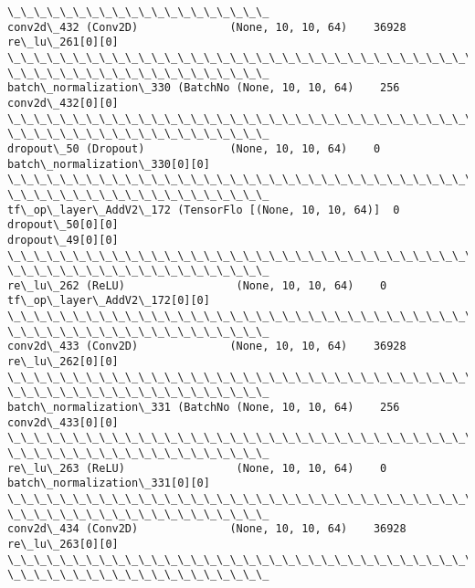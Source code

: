 \documentclass[11pt]{article}
\begin{document}
\begin{Verbatim}[commandchars=\\\{\}]
\_\_\_\_\_\_\_\_\_\_\_\_\_\_\_\_\_\_\_\_
conv2d\_432 (Conv2D)              (None, 10, 10, 64)    36928
re\_lu\_261[0][0]
\_\_\_\_\_\_\_\_\_\_\_\_\_\_\_\_\_\_\_\_\_\_\_\_\_\_\_\_\_\_\_\_\_\_\_\_\_\_\_\_\_\_\_\_\_\_\_\_\_\_\_\_\_\_\_\_\_\_\_\_\_\_\_\_\_\_\_\_\_\_\_\_\_\_\_\_\_\_\_\_
\_\_\_\_\_\_\_\_\_\_\_\_\_\_\_\_\_\_\_\_
batch\_normalization\_330 (BatchNo (None, 10, 10, 64)    256
conv2d\_432[0][0]
\_\_\_\_\_\_\_\_\_\_\_\_\_\_\_\_\_\_\_\_\_\_\_\_\_\_\_\_\_\_\_\_\_\_\_\_\_\_\_\_\_\_\_\_\_\_\_\_\_\_\_\_\_\_\_\_\_\_\_\_\_\_\_\_\_\_\_\_\_\_\_\_\_\_\_\_\_\_\_\_
\_\_\_\_\_\_\_\_\_\_\_\_\_\_\_\_\_\_\_\_
dropout\_50 (Dropout)             (None, 10, 10, 64)    0
batch\_normalization\_330[0][0]
\_\_\_\_\_\_\_\_\_\_\_\_\_\_\_\_\_\_\_\_\_\_\_\_\_\_\_\_\_\_\_\_\_\_\_\_\_\_\_\_\_\_\_\_\_\_\_\_\_\_\_\_\_\_\_\_\_\_\_\_\_\_\_\_\_\_\_\_\_\_\_\_\_\_\_\_\_\_\_\_
\_\_\_\_\_\_\_\_\_\_\_\_\_\_\_\_\_\_\_\_
tf\_op\_layer\_AddV2\_172 (TensorFlo [(None, 10, 10, 64)]  0
dropout\_50[0][0]
dropout\_49[0][0]
\_\_\_\_\_\_\_\_\_\_\_\_\_\_\_\_\_\_\_\_\_\_\_\_\_\_\_\_\_\_\_\_\_\_\_\_\_\_\_\_\_\_\_\_\_\_\_\_\_\_\_\_\_\_\_\_\_\_\_\_\_\_\_\_\_\_\_\_\_\_\_\_\_\_\_\_\_\_\_\_
\_\_\_\_\_\_\_\_\_\_\_\_\_\_\_\_\_\_\_\_
re\_lu\_262 (ReLU)                 (None, 10, 10, 64)    0
tf\_op\_layer\_AddV2\_172[0][0]
\_\_\_\_\_\_\_\_\_\_\_\_\_\_\_\_\_\_\_\_\_\_\_\_\_\_\_\_\_\_\_\_\_\_\_\_\_\_\_\_\_\_\_\_\_\_\_\_\_\_\_\_\_\_\_\_\_\_\_\_\_\_\_\_\_\_\_\_\_\_\_\_\_\_\_\_\_\_\_\_
\_\_\_\_\_\_\_\_\_\_\_\_\_\_\_\_\_\_\_\_
conv2d\_433 (Conv2D)              (None, 10, 10, 64)    36928
re\_lu\_262[0][0]
\_\_\_\_\_\_\_\_\_\_\_\_\_\_\_\_\_\_\_\_\_\_\_\_\_\_\_\_\_\_\_\_\_\_\_\_\_\_\_\_\_\_\_\_\_\_\_\_\_\_\_\_\_\_\_\_\_\_\_\_\_\_\_\_\_\_\_\_\_\_\_\_\_\_\_\_\_\_\_\_
\_\_\_\_\_\_\_\_\_\_\_\_\_\_\_\_\_\_\_\_
batch\_normalization\_331 (BatchNo (None, 10, 10, 64)    256
conv2d\_433[0][0]
\_\_\_\_\_\_\_\_\_\_\_\_\_\_\_\_\_\_\_\_\_\_\_\_\_\_\_\_\_\_\_\_\_\_\_\_\_\_\_\_\_\_\_\_\_\_\_\_\_\_\_\_\_\_\_\_\_\_\_\_\_\_\_\_\_\_\_\_\_\_\_\_\_\_\_\_\_\_\_\_
\_\_\_\_\_\_\_\_\_\_\_\_\_\_\_\_\_\_\_\_
re\_lu\_263 (ReLU)                 (None, 10, 10, 64)    0
batch\_normalization\_331[0][0]
\_\_\_\_\_\_\_\_\_\_\_\_\_\_\_\_\_\_\_\_\_\_\_\_\_\_\_\_\_\_\_\_\_\_\_\_\_\_\_\_\_\_\_\_\_\_\_\_\_\_\_\_\_\_\_\_\_\_\_\_\_\_\_\_\_\_\_\_\_\_\_\_\_\_\_\_\_\_\_\_
\_\_\_\_\_\_\_\_\_\_\_\_\_\_\_\_\_\_\_\_
conv2d\_434 (Conv2D)              (None, 10, 10, 64)    36928
re\_lu\_263[0][0]
\_\_\_\_\_\_\_\_\_\_\_\_\_\_\_\_\_\_\_\_\_\_\_\_\_\_\_\_\_\_\_\_\_\_\_\_\_\_\_\_\_\_\_\_\_\_\_\_\_\_\_\_\_\_\_\_\_\_\_\_\_\_\_\_\_\_\_\_\_\_\_\_\_\_\_\_\_\_\_\_
\_\_\_\_\_\_\_\_\_\_\_\_\_\_\_\_\_\_\_\_

\end{Verbatim}
\end{document}
